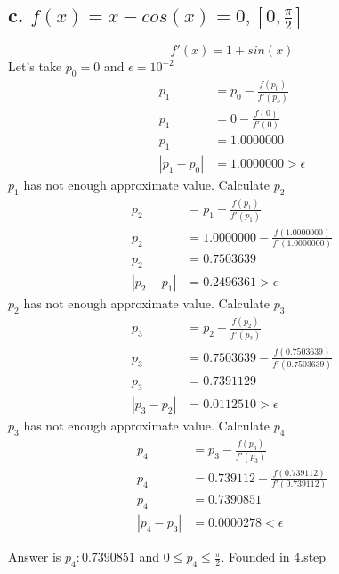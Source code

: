 \documentclass{article}
\begin{document}
\subsection{c. $f(x)=x-cos(x) = 0, [0, \frac{\pi}{2}]$}
\begin{equation}
f'(x)=1+sin(x)
\end{equation}
Let's take $p_0=0$ and $\epsilon=10^{-2}$
\begin{align}
\label{2.3.5.c.1}p_1 & = p_0 - \frac{f(p_0)}{f'(p_o)}\\
\label{2.3.5.c.2}p_1 & = 0 - \frac{f(0)}{f'(0)}\\
\label{2.3.5.c.3}p_1 & = 1.0000000\\
\label{2.3.5.c.4}|p_1-p_0| & =1.0000000 > \epsilon
\end{align}
$p_1$ has not enough approximate value. Calculate $p_2$
\begin{align}
\label{2.3.5.c.1}p_2 & = p_1 - \frac{f(p_1)}{f'(p_1)}\\
\label{2.3.5.c.2}p_2 & = 1.0000000 - \frac{f(1.0000000)}{f'(1.0000000)}\\
\label{2.3.5.c.3}p_2 & = 0.7503639\\
\label{2.3.5.c.4}|p_2-p_1| & =0.2496361 > \epsilon
\end{align}
$p_2$ has not enough approximate value. Calculate $p_3$
\begin{align}
\label{2.3.5.c.1}p_3 & = p_2 - \frac{f(p_2)}{f'(p_2)}\\
\label{2.3.5.c.2}p_3 & = 0.7503639 - \frac{f(0.7503639)}{f'(0.7503639)}\\
\label{2.3.5.c.3}p_3 & = 0.7391129\\
\label{2.3.5.c.4}|p_3-p_2| & =0.0112510 > \epsilon
\end{align}
$p_3$ has not enough approximate value. Calculate $p_4$
\begin{align}
\label{2.3.5.c.1}p_4 & = p_3 - \frac{f(p_3)}{f'(p_3)}\\
\label{2.3.5.c.2}p_4 & = 0.739112 - \frac{f(0.739112)}{f'(0.739112)}\\
\label{2.3.5.c.3}p_4 & = 0.7390851\\
\label{2.3.5.c.4}|p_4-p_3| & =0.0000278 < \epsilon
\end{align}

Answer is $p_4:0.7390851$ and $0\leq p_4 \leq \frac{\pi}{2}$. Founded in 4.step\\\\
\end{document}
